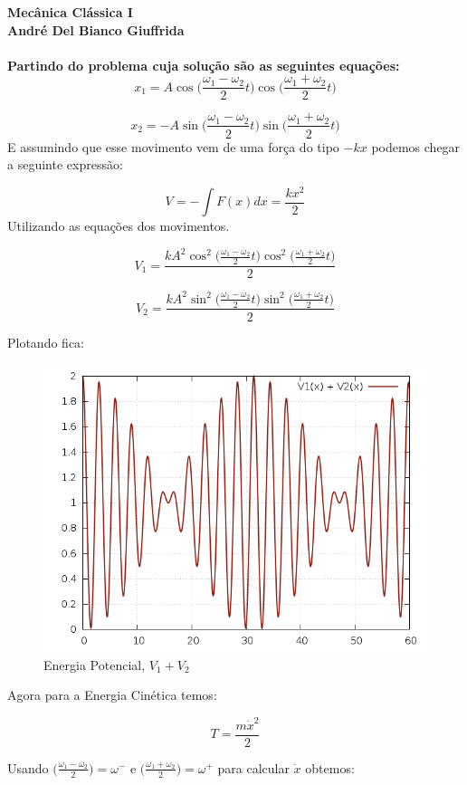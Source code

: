 \documentclass[a4paper,12pt]{exam}
\begin{document}
\begingroup 
	  \bf \Large Mecânica Clássica I\\
	  \indent \normalsize André Del Bianco Giuffrida
	\endgroup
	\\ \quad
	\\
	Partindo do problema cuja solução são as seguintes equações:
	\[ x_1 = A \cos{\Big(\frac{\omega_1 - \omega_2}{2} t \Big)}\cos{\Big(\frac{\omega_1 + \omega_2}{2} t \Big)}\]
	
	\[ x_2 = - A \sin{\Big(\frac{\omega_1 - \omega_2}{2} t \Big)}\sin{\Big(\frac{\omega_1 + \omega_2}{2} t \Big)}\]
	E assumindo que esse movimento vem de uma força do tipo $-kx$ podemos chegar a seguinte expressão:
	
	\[ V = - \int F(x)dx = \frac{kx^2}{2}\]
	Utilizando as equações dos movimentos.
	
	\[ V_1 = \frac{kA^2\cos^2{\Big(\frac{\omega_1 - \omega_2}{2} t \Big)}\cos^2{\Big(\frac{\omega_1 + \omega_2}{2} t \Big)}}{2}\]
	
	\[ V_2 = \frac{kA^2 \sin^2{\Big(\frac{\omega_1 - \omega_2}{2} t \Big)}\sin^2{\Big(\frac{\omega_1 + \omega_2}{2} t \Big)}}{2}\]
	
	Plotando fica:
		\begin{figure}[h]
			\centering
			\includegraphics[scale=0.6]{5o0.png}
			\caption{Energia Potencial, $V_1 + V_2$}
		\end{figure}
		
	Agora para a Energia Cinética temos:
	
	\[ T = \frac{m\dot x^2}{2} \]
	
	Usando $\Big(\frac{\omega_1 - \omega_2}{2} \Big) = \omega^{-}$ e $\Big(\frac{\omega_1 + \omega_2}{2} \Big) = \omega^{+}$ para calcular $\dot x$ obtemos:
	
\end{document}
